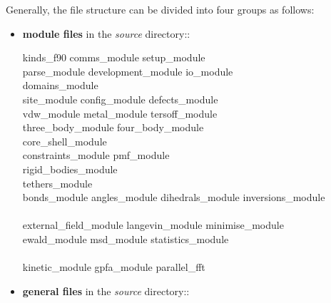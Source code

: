 Generally, the \D file structure can be divided into four groups
as follows:
\begin{itemize}

\item {\bf module files} in the {\em source} directory::

{\sc
kinds\_f90 comms\_module setup\_module \\
parse\_module development\_module io\_module \\
domains\_module \\
site\_module config\_module defects\_module \\
vdw\_module metal\_module tersoff\_module \\
three\_body\_module four\_body\_module \\
core\_shell\_module \\
constraints\_module pmf\_module \\
rigid\_bodies\_module \\
tethers\_module \\
bonds\_module angles\_module dihedrals\_module inversions\_module \\
\\
external\_field\_module langevin\_module minimise\_module \\
ewald\_module msd\_module statistics\_module \\
\\
kinetic\_module gpfa\_module parallel\_fft}

\item {\bf general files} in the {\em source} directory::


\end{itemize}
